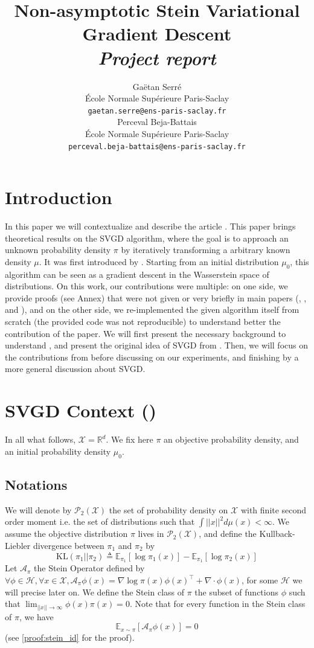 \documentclass{article}
\title{Non-asymptotic Stein Variational Gradient Descent\\
{\it Project report}}
\author{%
  Gaëtan Serré\\
  École Normale Supérieure Paris-Saclay\\
  \texttt{gaetan.serre@ens-paris-saclay.fr}\\
  \And Perceval Beja-Battais\\
  École Normale Supérieure Paris-Saclay\\
  \texttt{perceval.beja-battais@ens-paris-saclay.fr}\\
}
\newcommand{\R}{\mathbb{R}}
\newcommand{\E}{\mathbb{E}}
\newcommand{\X}{\mathcal{X}}
\newcommand{\A}{\mathcal{A}}
\renewcommand{\P}{\mathcal{P}}
\newcommand{\KL}{\mathrm{KL}}
\renewcommand{\H}{\mathcal{H}}
\begin{document}
\maketitle


\section{Introduction}
In this paper we will contextualize and describe the article \cite{main-paper}. This paper brings theoretical results on the SVGD algorithm, where the goal is to approach an unknown probability density $\pi$ by iteratively transforming a arbitrary known density $\mu$. It was first introduced by \cite{Original-SVGD}. Starting from an initial distribution $\mu_0$, this algorithm can be seen as a gradient descent in the Wasserstein space of distributions. On this work, our contributions were multiple: on one side, we provide proofs (see Annex) that were not given or very briefly in main papers (\cite{main-paper}, \cite{Original-SVGD}, and \cite{SVGD-flow}), and on the other side, we re-implemented the given algorithm itself from scratch (the provided code was not reproducible) to understand better the contribution of the paper. \newline
We will first present the necessary background to understand \cite{main-paper}, and present the original idea of SVGD from \cite{Original-SVGD}. Then, we will focus on the contributions from \cite{main-paper} before discussing on our experiments, and finishing by a more general discussion about SVGD.

\section{SVGD Context (\cite{Original-SVGD})}
In all what follows, $\X = \R^d$. \newline
We fix here $\pi$ an objective probability density, and an initial probability density $\mu_0$. 
\subsection{Notations}
We will denote by $\P_2(\X)$ the set of probability density on $\X$ with finite second order moment i.e. the set of distributions such that $\int ||x||^2 d\mu(x) < \infty$. We assume the objective distribution $\pi$ lives in $\P_2(\X)$, and define the Kullback-Liebler divergence between $\pi_1$ and $\pi_2$ by
$$\KL(\pi_1||\pi_2) \triangleq \E_{\pi_1} [\log \pi_1(x)] - \E_{\pi_1}[\log \pi_2(x)]$$ \newline
Let $\A_\pi$ the Stein Operator defined by $\forall \phi \in \H, \forall x \in \X, \A_\pi \phi(x) = \nabla \log \pi(x) \phi(x)^\top + \nabla\cdot \phi(x)$, for some $\H$ we will precise later on. \newline
We define the Stein class of $\pi$ the subset of functions $\phi$ such that $\lim_{||x||\longrightarrow \infty} \phi(x)\pi(x) = 0$. Note that for every function in the Stein class of $\pi$, we have \begin{equation}
  \E_{x \sim \pi}[\A_\pi \phi (x)] = 0
  \label{eq:stein_id}
\end{equation}
(see \ref{proof:stein_id} for the proof).\newline
\end{document}
